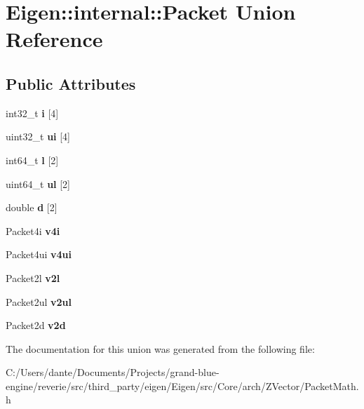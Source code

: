 \hypertarget{union_eigen_1_1internal_1_1_packet}{}\section{Eigen\+::internal\+::Packet Union Reference}
\label{union_eigen_1_1internal_1_1_packet}
\subsection*{Public Attributes}
\begin{DoxyCompactItemize}
\item 
\mbox{\label{union_eigen_1_1internal_1_1_packet_a73485360dd91d7e59db417e445931749}} 
int32\+\_\+t {\bfseries i} \mbox{[}4\mbox{]}
\item 
\mbox{\label{union_eigen_1_1internal_1_1_packet_a3ea45786676267b331c9c1fa5366904d}} 
uint32\+\_\+t {\bfseries ui} \mbox{[}4\mbox{]}
\item 
\mbox{\label{union_eigen_1_1internal_1_1_packet_a96a1067820acbac4c481fe63b78ebcb4}} 
int64\+\_\+t {\bfseries l} \mbox{[}2\mbox{]}
\item 
\mbox{\label{union_eigen_1_1internal_1_1_packet_a9ed24e8cc724a9af68aa9ca9a37d18a6}} 
uint64\+\_\+t {\bfseries ul} \mbox{[}2\mbox{]}
\item 
\mbox{\label{union_eigen_1_1internal_1_1_packet_ac7106df37783ca7e863f2aac2d77b40e}} 
double {\bfseries d} \mbox{[}2\mbox{]}
\item 
\mbox{\label{union_eigen_1_1internal_1_1_packet_a80c11722980f20f903a873831f4f11e5}} 
Packet4i {\bfseries v4i}
\item 
\mbox{\label{union_eigen_1_1internal_1_1_packet_ab725695337c5673ab0eea5fe958e1948}} 
Packet4ui {\bfseries v4ui}
\item 
\mbox{\label{union_eigen_1_1internal_1_1_packet_ac12660f5bd77d2906e0e2ac8464877dd}} 
Packet2l {\bfseries v2l}
\item 
\mbox{\label{union_eigen_1_1internal_1_1_packet_a392b94f62f7d878ce68cca757a6d8d0c}} 
Packet2ul {\bfseries v2ul}
\item 
\mbox{\label{union_eigen_1_1internal_1_1_packet_af5ca72a89eda67aedb62d67efed0835e}} 
Packet2d {\bfseries v2d}
\end{DoxyCompactItemize}


The documentation for this union was generated from the following file\+:\begin{DoxyCompactItemize}
\item 
C\+:/\+Users/dante/\+Documents/\+Projects/grand-\/blue-\/engine/reverie/src/third\+\_\+party/eigen/\+Eigen/src/\+Core/arch/\+Z\+Vector/Packet\+Math.\+h\end{DoxyCompactItemize}

